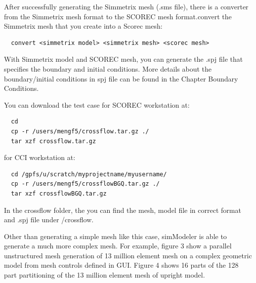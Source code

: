 \documentclass{article}
\begin{document}
After successfully generating the Simmetrix mesh (.sms file), there is a converter from the Simmetrix mesh format to the SCOREC mesh format.convert the Simmetrix mesh that you create into a Scorec mesh:
  \begin{lstlisting}
  convert <simmetrix model> <simmetrix mesh> <scorec mesh>
  \end{lstlisting}

With Simmetrix model and SCOREC mesh, you can generate the .spj file that specifies the boundary and initial conditions. More details about the boundary/initial conditions in spj file can be found in the Chapter Boundary Conditions. 

You can download the test case for SCOREC workstation at:
   \begin{lstlisting}
  cd
  cp -r /users/mengf5/crossflow.tar.gz ./
  tar xzf crossflow.tar.gz
  \end{lstlisting}
for CCI workstation at:
  \begin{lstlisting}
  cd /gpfs/u/scratch/myprojectname/myusername/
  cp -r /users/mengf5/crossflowBGQ.tar.gz ./
  tar xzf crossflowBGQ.tar.gz
  \end{lstlisting}
In the crossflow folder, the you can find the mesh, model file in correct format and .spj file under /crossflow.

Other than generating a simple mesh like this case, simModeler is able to generate a much more complex mesh. For example, figure 3 show a parallel unstructured mesh generation of 13 million element mesh on a complex geometric model from mesh controls defined in GUI. Figure 4 shows 16 parts of the 128 part partitioning of the 13 million element mesh of upright model.
\end{document}
